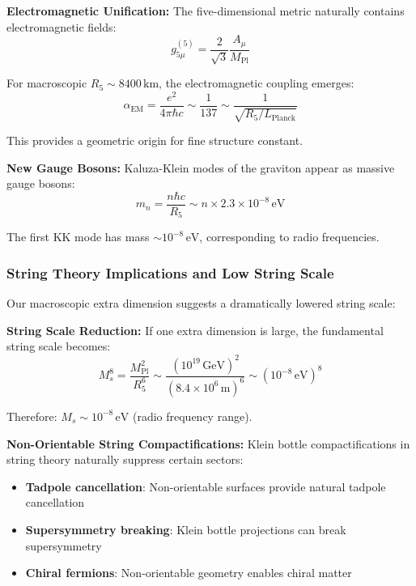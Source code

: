 \documentclass[reprint,amsmath,amssymb,aps,prd]{revtex4-2}
\newcommand{\km}{\,\text{km}}
\begin{document}
\textbf{Electromagnetic Unification:}
The five-dimensional metric naturally contains electromagnetic fields:
\begin{equation}
g^{(5)}_{5\mu} = \frac{2}{\sqrt{3}} \frac{A_\mu}{M_{\text{Pl}}}
\end{equation}

For macroscopic $R_5 \sim 8400\km$, the electromagnetic coupling emerges:
\begin{equation}
\alpha_{\text{EM}} = \frac{e^2}{4\pi\hbar c} \sim \frac{1}{137} \sim \frac{1}{\sqrt{R_5/L_{\text{Planck}}}}
\end{equation}

This provides a geometric origin for fine structure constant.

\textbf{New Gauge Bosons:}
Kaluza-Klein modes of the graviton appear as massive gauge bosons:
\begin{equation}
m_{n} = \frac{n\hbar c}{R_5} \sim n \times 2.3 \times 10^{-8}\,\text{eV}
\end{equation}

The first KK mode has mass $\sim 10^{-8}\,\text{eV}$, corresponding to radio frequencies.

\subsubsection{String Theory Implications and Low String Scale}

Our macroscopic extra dimension suggests a dramatically lowered string scale:

\textbf{String Scale Reduction:}
If one extra dimension is large, the fundamental string scale becomes:
\begin{equation}
M_s^8 = \frac{M_{\text{Pl}}^2}{R_5^6} \sim \frac{(10^{19}\,\text{GeV})^2}{(8.4 \times 10^6\,\text{m})^6} \sim (10^{-8}\,\text{eV})^8
\end{equation}

Therefore: $M_s \sim 10^{-8}\,\text{eV}$ (radio frequency range).

\textbf{Non-Orientable String Compactifications:}
Klein bottle compactifications in string theory naturally suppress certain sectors:
\begin{itemize}
\item \textbf{Tadpole cancellation}: Non-orientable surfaces provide natural tadpole cancellation
\item \textbf{Supersymmetry breaking}: Klein bottle projections can break supersymmetry
\item \textbf{Chiral fermions}: Non-orientable geometry enables chiral matter
\end{itemize}
\end{document}

